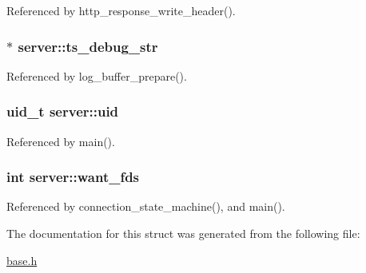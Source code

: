 Referenced by http\-\_\-response\-\_\-write\-\_\-header().

\hypertarget{structserver_a0c7533cfeef213bb4e72350333ea8a1b}{
\subsubsection[{ts\-\_\-debug\-\_\-str}]{$\ast$ server\-::ts\-\_\-debug\-\_\-str}}\label{structserver_a0c7533cfeef213bb4e72350333ea8a1b}


Referenced by log\-\_\-buffer\-\_\-prepare().

\hypertarget{structserver_a2ccaa2dbbc269d6156bfb5685ee86870}{
\subsubsection[{uid}]{\setlength{\rightskip}{0pt plus 5cm}uid\-\_\-t server\-::uid}}\label{structserver_a2ccaa2dbbc269d6156bfb5685ee86870}


Referenced by main().

\hypertarget{structserver_a5f3524c33bbea0b20ddbd4492027bce9}{
\subsubsection[{want\-\_\-fds}]{\setlength{\rightskip}{0pt plus 5cm}int server\-::want\-\_\-fds}}\label{structserver_a5f3524c33bbea0b20ddbd4492027bce9}


Referenced by connection\-\_\-state\-\_\-machine(), and main().



The documentation for this struct was generated from the following file\-:\begin{DoxyCompactItemize}
\item 
\hyperlink{base_8h}{base.\-h}\end{DoxyCompactItemize}

